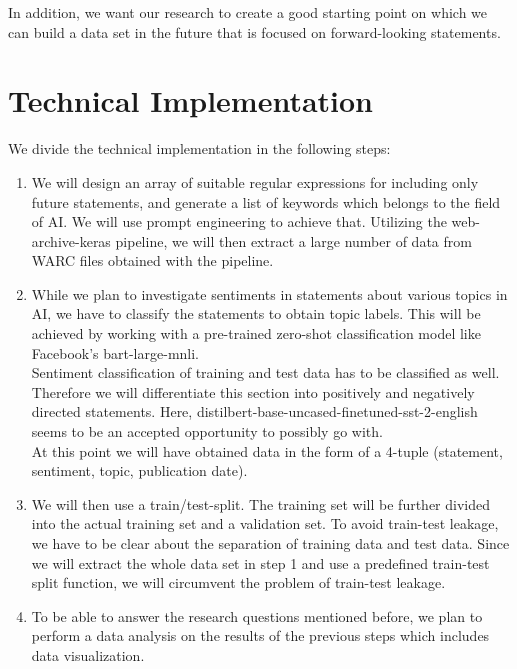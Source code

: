 \documentclass[11pt]{article}
\begin{document}
In addition, we want our research to create a good starting point on which we can build a data set in the future that is focused on forward-looking statements.

\section{Technical Implementation}

We divide the technical implementation in the following steps:

\begin{enumerate}
\item We will design an array of suitable regular expressions for including only future statements, and generate a list of keywords which belongs to the field of AI. We will use prompt engineering to achieve that. Utilizing the web-archive-keras pipeline, we will then extract a large number of data from WARC files obtained with the pipeline.

\item While we plan to investigate sentiments in statements about various topics in AI, we have to classify the statements to obtain topic labels. This will be achieved by working with a pre-trained zero-shot classification model like Facebook’s bart-large-mnli.
\\ Sentiment classification of training and test data has to be classified as well. Therefore we will differentiate this section into positively and negatively directed statements. Here, distilbert-base-uncased-finetuned-sst-2-english seems to be an accepted opportunity to possibly go with.
\\ At this point we will have obtained data in the form of a 4-tuple (statement, sentiment, topic, publication date).
    
\item We will then use a train/test-split. The training set will be further divided into the actual training set and a validation set. To avoid train-test leakage, we have to be clear about the separation of training data and test data. Since we will extract the whole data set in step 1 and use a predefined train-test split function, we will circumvent the problem of train-test leakage.
\item To be able to answer the research questions mentioned before, we plan to perform a data analysis on the results of the previous steps which includes data visualization.
\end{enumerate}
\end{document}
